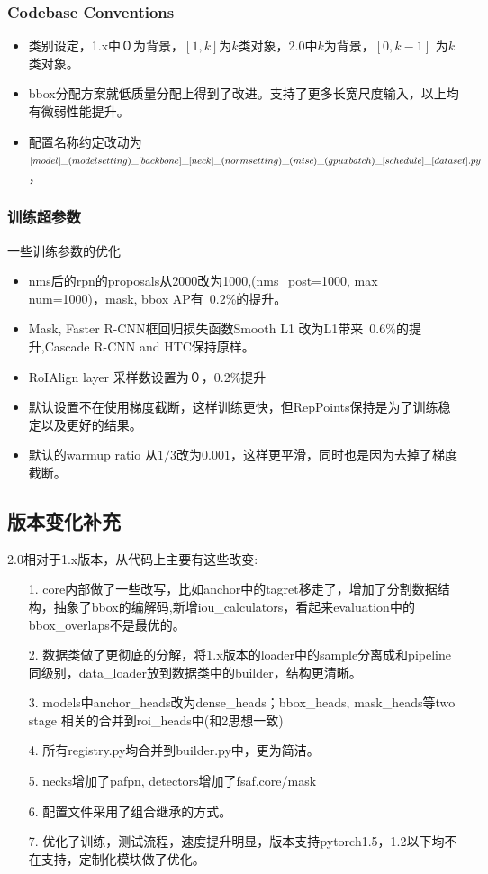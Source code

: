 \documentclass[UTF8]{ctexart}
\begin{document}
\subsubsection{Codebase Conventions}

\begin{itemize}
	\item 类别设定，1.x中０为背景，$[1, k]$为$k$类对象，2.0中$k$为背景，$[0, k-1]$ 为$k$类对象。
	\item bbox分配方案就低质量分配上得到了改进。支持了更多长宽尺度输入，以上均有微弱性能提升。
	\item 配置名称约定改动为 $[model]\_(model setting)\_[backbone]\_[neck]\_(no
	\newline
	rmsetting)\_(misc)\_(gpu x batch)\_[schedule]\_[dataset].py$，
\end{itemize}


\subsubsection{训练超参数}
一些训练参数的优化
\begin{itemize}
	\item nms后的rpn的proposals从2000改为1000,(nms\_post=1000, max\_
	num=1000)，mask, bbox AP有~0.2\%的提升。
	\item Mask, Faster R-CNN框回归损失函数Smooth L1 改为L1带来~0.6\%的提升,Cascade R-CNN and HTC保持原样。
	\item RoIAlign layer 采样数设置为０，0.2\%提升
	\item 默认设置不在使用梯度截断，这样训练更快，但RepPoints保持是为了训练稳定以及更好的结果。
	\item 默认的warmup ratio 从$1/3$改为$0.001$，这样更平滑，同时也是因为去掉了梯度截断。
\end{itemize}


\subsection{版本变化补充}
2.0相对于1.x版本，从代码上主要有这些改变:
\begin{itemize}
	\item[1.] core内部做了一些改写，比如anchor中的tagret移走了，增加了分割数据结构，抽象了bbox的编解码,新增iou\_calculators，看起来evaluation中的bbox\_overlaps不是最优的。
	\item[2.] 数据类做了更彻底的分解，将1.x版本的loader中的sample分离成和pipeline同级别，data\_loader放到数据类中的builder，结构更清晰。
	\item[3.] models中anchor\_heads改为dense\_heads；bbox\_heads, mask\_heads等two stage 相关的合并到roi\_heads中(和2思想一致)
	\item[4.] 所有registry.py均合并到builder.py中，更为简洁。
	\item[5.] necks增加了pafpn, detectors增加了fsaf,core/mask
	\item[6.] 配置文件采用了组合继承的方式。
	\item[7.] 优化了训练，测试流程，速度提升明显，版本支持pytorch1.5，1.2以下均不在支持，定制化模块做了优化。
\end{itemize}
\end{document}
